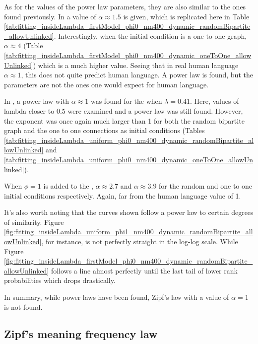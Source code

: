 As for the values of the power law parameters, they are also similar to the ones found previously.
In \cite{Ferrer2005a} a value of $\alpha \approx 1.5$ is given, which is replicated here in Table \ref{tab:fitting_insideLambda_firstModel_phi0_nm400_dynamic_randomBipartite_allowUnlinked}.
Interestingly, when the initial condition is a one to one graph, $\alpha \approx 4$ (Table \ref{tab:fitting_insideLambda_firstModel_phi0_nm400_dynamic_oneToOne_allowUnlinked}) which is a much higher value.
Seeing that in real human language $\alpha \approx 1$, this does not quite predict human language.
A power law is found, but the parameters are not the ones one would expect for human language.

In \cite{Ferrer2003a}, a power law with $\alpha \approx 1$ was found for the \secondmodel{} when $\lambda=0.41$.
Here, values of lambda closer to 0.5 were examined and a power law was still found.
However, the exponent was once again much larger than 1 for both the random bipartite graph and the one to one connections as initial conditions (Tables \ref{tab:fitting_insideLambda_uniform_phi0_nm400_dynamic_randomBipartite_allowUnlinked} and \ref{tab:fitting_insideLambda_uniform_phi0_nm400_dynamic_oneToOne_allowUnlinked}).

When $\phi=1$ is added to the \secondmodel{}, $\alpha \approx 2.7$ and $\alpha \approx 3.9$ for the random and one to one initial conditions respectively. Again, far from the human language value of 1.

It's also worth noting that the curves shown follow a power law to certain degrees of similarity.
Figure \ref{fig:fitting_insideLambda_uniform_phi1_nm400_dynamic_randomBipartite_allowUnlinked}, for instance, is not perfectly straight in the log-log scale.
While Figure \ref{fig:fitting_insideLambda_firstModel_phi0_nm400_dynamic_randomBipartite_allowUnlinked} follows a line almost perfectly until the last tail of lower rank probabilities which drops drastically.

In summary, while power laws have been found, Zipf's law with a value of $\alpha=1$ is not found.

\subsection{Zipf's meaning frequency law}
\label{sec:discussion_math_meaning-freq}

